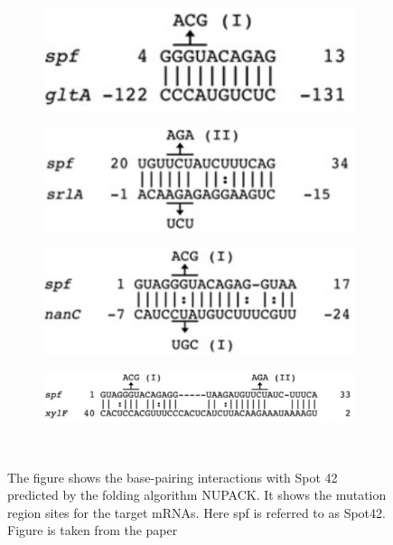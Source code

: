 \documentclass[twoside,a4paper]{report}
\numberwithin{equation}{section}
\begin{document}
\begin{figure}[h!tb]
	\centering
	\begin{subfigure}{.5\textwidth}
		\centering
		\includegraphics[width=.7\linewidth]{gltA2}	
		\label{fig:gltA2}
	\end{subfigure}%
	\begin{subfigure}{.5\textwidth}
		\centering
		\includegraphics[width=.7\linewidth]{srla2}
		
		\label{fig:srla2}
	\end{subfigure}
	\begin{subfigure}{.5\textwidth}
		\centering
		\includegraphics[width=.7\linewidth]{nanc2}
		\label{fig:nanc2}
	\end{subfigure}%
	\begin{subfigure}{.5\textwidth}
		\centering
		\includegraphics[width=1\linewidth]{xylf2}
		
		\label{fig:xylf2}
	\end{subfigure}
	\
	\caption{ The figure shows the base-pairing interactions with Spot 42 predicted by the folding algorithm NUPACK. It shows the mutation region sites for the target mRNAs. Here spf is referred to as Spot42. Figure is taken from the paper \citep{beisel2011base} \\ }
	\label{fig:all1}
\end{figure}
\end{document}
